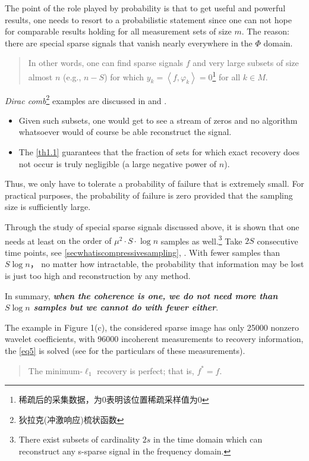 The point of the role played by probability is that to get useful and powerful results, one needs to resort to a probabilistic statement since one can not hope for comparable results holding for all measurement sets of size $m$. The reason: there are special sparse signals that vanish nearly everywhere in the $\Phi$ domain.
\begin{quote}
	In other words, one can find sparse signals $f$ and very large subsets of size almost $n$ (e.g., $n-S$) for which $y_k=\left<f,\varphi_k\right>=0$\footnote{稀疏后的采集数据，为0表明该位置稀疏采样值为0} for all $k \in M$.
\end{quote}
\emph{Dirac comb}\footnote{狄拉克(冲激响应)梳状函数} examples are discussed in \cite{14} and \cite{Candes2006}. 
\begin{itemize}
	\item Given such subsets, one would get to see a stream of zeros and no algorithm whatsoever would of course be able reconstruct the signal.
	\item The \cref{th1.1} guarantees that the fraction of sets for which exact recovery does not occur is truly negligible (a large negative power of $n$).
\end{itemize} 
Thus, we only have to tolerate a probability of failure that is extremely small. \textcolor[rgb]{1,0,0}{For practical purposes, the probability of failure is zero provided that the sampling size is sufficiently large.}

Through the study of special sparse signals discussed above, it is shown that one needs at least \textcolor[rgb]{1,0,0}{on the order of $\mu^2 \cdot S \cdot \log n$} samples as well.\footnote{There exist subsets of cardinality $2s$ in the time domain which can reconstruct any s-sparse signal in the frequency domain.} Take $2S$ consecutive time points, see \cref{secwhatiscompressivesampling},  \cite{11,12}. With fewer samples than $S \log n$， no matter how intractable, the probability that information may be lost is just \textcolor[rgb]{1,0,0}{too high and reconstruction by any method}. 

In summary, \emph{\textbf{when the coherence is one, we do not need more than $S \log n$ samples but we cannot do with fewer either}}.

The example in Figure 1(c)\cite{Candes2008}, the considered sparse image has only 25000 nonzero wavelet coefficients, with 96000 incoherent measurements to recovery information, the \cref{eq5} is solved (see \cite{Candes2007} for the particulars of these measurements). 
\begin{quote}
	The minimum-$\ell_1$ recovery is perfect; that is, $f^*=f$.
\end{quote}

